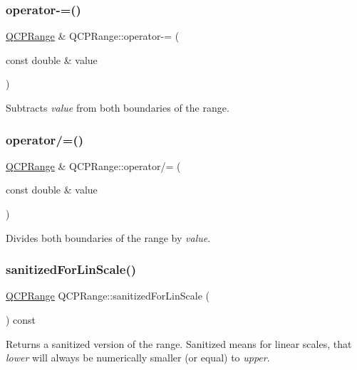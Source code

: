 \subsubsection{\texorpdfstring{operator-\/=()}{operator-=()}}
{\footnotesize\ttfamily \hyperlink{classQCPRange}{Q\+C\+P\+Range} \& Q\+C\+P\+Range\+::operator-\/= (\begin{DoxyParamCaption}\item[{const double \&}]{value }\end{DoxyParamCaption})\hspace{0.3cm}{\ttfamily [inline]}}

Subtracts {\itshape value} from both boundaries of the range. \mbox{\label{classQCPRange_a6137d8682b6835ace840730b4c1e2d63}} 
\subsubsection{\texorpdfstring{operator/=()}{operator/=()}}
{\footnotesize\ttfamily \hyperlink{classQCPRange}{Q\+C\+P\+Range} \& Q\+C\+P\+Range\+::operator/= (\begin{DoxyParamCaption}\item[{const double \&}]{value }\end{DoxyParamCaption})\hspace{0.3cm}{\ttfamily [inline]}}

Divides both boundaries of the range by {\itshape value}. \mbox{\label{classQCPRange_a808751fdd9b17ef52327ba011df2e5f1}} 
\subsubsection{\texorpdfstring{sanitized\+For\+Lin\+Scale()}{sanitizedForLinScale()}}
{\footnotesize\ttfamily \hyperlink{classQCPRange}{Q\+C\+P\+Range} Q\+C\+P\+Range\+::sanitized\+For\+Lin\+Scale (\begin{DoxyParamCaption}{ }\end{DoxyParamCaption}) const}

Returns a sanitized version of the range. Sanitized means for linear scales, that {\itshape lower} will always be numerically smaller (or equal) to {\itshape upper}. \mbox{\label{classQCPRange_a3d66288d66e1d6df3636075eb42502ee}} 
